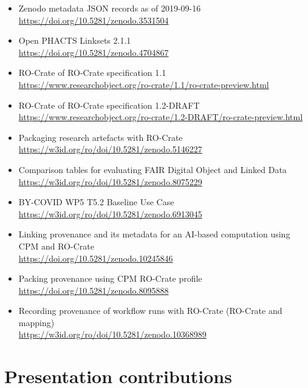 \begin{itemize}
  \item
    Zenodo metadata JSON records as of 2019-09-16\\
    \url{https://doi.org/10.5281/zenodo.3531504}
  \item
    Open PHACTS Linksets 2.1.1\\
    \url{https://doi.org/10.5281/zenodo.4704867}
  \item
    RO-Crate of RO-Crate specification 1.1 \cite{rocrate1.1} \\
    \url{https://www.researchobject.org/ro-crate/1.1/ro-crate-preview.html}
  \item 
    RO-Crate of RO-Crate specification 1.2-DRAFT \\
    \url{https://www.researchobject.org/ro-crate/1.2-DRAFT/ro-crate-preview.html}      
  \item Packaging research artefacts with RO-Crate \cite{10.5281/zenodo.5833456} \\ 
    \url{https://w3id.org/ro/doi/10.5281/zenodo.5146227}
  \item Comparison tables for evaluating FAIR Digital Object and Linked Data \cite{soilandreyes2023} \\
    \url{https://w3id.org/ro/doi/10.5281/zenodo.8075229}
  \item BY-COVID WP5 T5.2 Baseline Use Case \\
    \url{https://w3id.org/ro/doi/10.5281/zenodo.6913045}
  \item Linking provenance and its metadata for an AI-based computation using CPM and RO-Crate \\
    \url{https://doi.org/10.5281/zenodo.10245846}
    \item
    Packing provenance using CPM RO-Crate profile \cite{Wittner 2023c} \\
    \url{https://doi.org/10.5281/zenodo.8095888}
  \item Recording provenance of workflow runs with RO-Crate (RO-Crate and mapping) \cite{wrroc-crate} \\ 
    \url{https://w3id.org/ro/doi/10.5281/zenodo.10368989}


    
\end{itemize}


\section{Presentation contributions}

